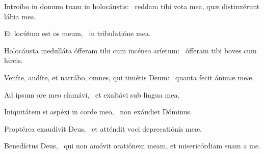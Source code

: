 
\item Introíbo in domum tuam in holocáustis:~\psstar{} reddam tibi vota mea, quæ distinxérunt lábia mea.

\item Et locútum est os meum,~\psstar{} in tribulatióne mea.

\item Holocáusta medulláta ófferam tibi cum incénso aríetum:~\psstar{} ófferam tibi boves cum hircis.

\item Veníte, audíte, et narrábo, omnes, qui timétis Deum:~\psstar{} quanta fecit ánimæ meæ.

\item Ad ipsum ore meo clamávi,~\psstar{} et exaltávi sub lingua mea.

\item Iniquitátem si aspéxi in corde meo,~\psstar{} non exáudiet Dóminus.

\item Proptérea exaudívit Deus,~\psstar{} et atténdit voci deprecatiónis meæ.

\item Benedíctus Deus,~\psstar{} qui non amóvit oratiónem meam, et misericórdiam suam a me.